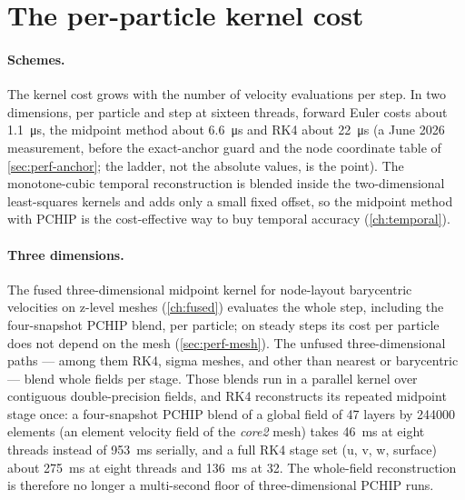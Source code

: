 \section{The per-particle kernel cost}\label{sec:perf-schemes}

\paragraph{Schemes.} The kernel cost grows with the number of velocity evaluations per step. In two
dimensions, per particle and step at sixteen threads, forward Euler costs about \SI{1.1}{\micro s},
the midpoint method about \SI{6.6}{\micro s} and RK4 about \SI{22}{\micro s} (a June 2026
measurement, before the exact-anchor guard and the node coordinate table of
\cref{sec:perf-anchor}; the ladder, not the absolute values, is the point). The monotone-cubic
temporal reconstruction is blended inside the two-dimensional least-squares kernels and adds only a small fixed
offset, so the midpoint method with PCHIP is the cost-effective way to buy temporal accuracy
(\cref{ch:temporal}).

\paragraph{Three dimensions.} The fused three-dimensional midpoint kernel for node-layout
barycentric velocities on z-level meshes (\cref{ch:fused}) evaluates the whole step, including the
four-snapshot PCHIP blend, per particle; on steady steps its cost per particle does not depend on the
mesh (\cref{sec:perf-mesh}). The unfused three-dimensional paths --- among them RK4, sigma meshes, and
 other than nearest or barycentric --- blend whole fields per stage. Those blends
run in a parallel kernel over contiguous double-precision fields, and RK4 reconstructs its repeated
midpoint stage once: a four-snapshot PCHIP blend of a global field of \num{47} layers by
\num{244000} elements (an element velocity field of the \emph{core2} mesh) takes \SI{46}{ms} at eight threads instead of \SI{953}{ms} serially, and a full
RK4 stage set (u, v, w, surface) about \SI{275}{ms} at eight threads and \SI{136}{ms} at 32. The
whole-field reconstruction is therefore no longer a multi-second floor of three-dimensional PCHIP
runs.


